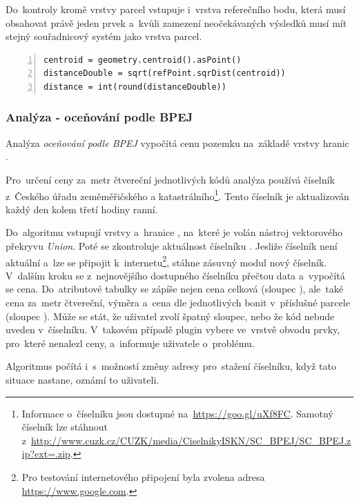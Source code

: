 Do~kontroly kromě vrstvy parcel vstupuje i~vrstva referečního bodu, která musí obsahovat právě jeden prvek a~kvůli zamezení neočekávaných výsledků musí mít stejný souřadnicový systém jako vrstva parcel.

{\scriptsize
\begin{lstlisting}[style=python, caption={Analýza \textit{měření vzdálenosti}~– výpočet vzdálenosti težiště od~refenčního bodu}, captionpos=b, label=analyza_vzdalenost_vypocet_vzdalenosti_teziste_od_ref_bodu, backgroundcolor = \color{light-gray},  numbers=left]
centroid = geometry.centroid().asPoint()
distanceDouble = sqrt(refPoint.sqrDist(centroid))
distance = int(round(distanceDouble))
\end{lstlisting}}

\subsubsection{Analýza - oceňování podle BPEJ}
\label{analyza_bpej}

Analýza \textit{oceňování podle BPEJ} vypočítá cenu pozemku na~základě vrstvy hranic .

Pro~určení ceny za~metr čtvereční jednotlivých kódů  analýza používá číselník  z~Českého úřadu zeměměřičského a katastrálního\footnote{Informace o~číselníku jsou dostupné na~\url{https://goo.gl/uXf8FC}. Samotný číselník lze stáhnout z~\url{http://www.cuzk.cz/CUZK/media/CiselnikyISKN/SC_BPEJ/SC_BPEJ.zip?ext=.zip}.}. Tento číselník je aktualizován každý den kolem třetí hodiny ranní.

Do~algoritmu vstupují vrstvy \texttt{} a~hranice , na~které je volán nástroj vektorového překryvu \textit{Union}. Poté se zkontroluje aktuálnost číselníku . Jesliže číselník není aktuální a~lze se připojit k~internetu\footnote{Pro testování internetového připojení byla zvolena adresa \url{https://www.google.com}.}, stáhne zásuvný modul nový číselník. V~dalším kroku se z~nejnovějšího dostupného číselníku přečtou data a~vypočítá se cena. Do~atributové tabulky se zápíše nejen cena celková (sloupec \texttt{}), ale~také cena za~metr čtvereční, výměra a~cena dle jednotlivých bonit v~příslušné parcele (sloupec \texttt{}). Může se stát, že uživatel zvolí špatný sloupec, nebo že kód  nebude uveden v~číselníku. V~takovém případě plugin vybere ve~vrstvě obvodu prvky, pro~které nenalezl ceny, a~informuje uživatele o~problému.

Algoritmus počítá i~s~možností změny adresy pro~stažení číselníku, když tato situace nastane, oznámí to uživateli.

